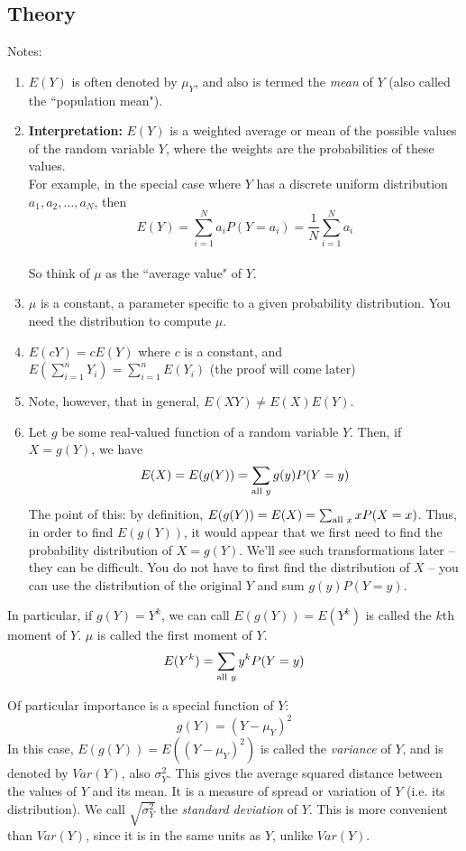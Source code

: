 \documentclass[12pt]{article}
\begin{document}
\subsection{Theory}
Notes:
\begin{enumerate}
    \item $E(Y)$ is often denoted by $\mu_Y$, and also is termed the \emph{mean} of $Y$ (also called the ``population mean").
    \item \textbf{Interpretation:} $E(Y)$ is a weighted average or mean of the possible values of the random variable $Y$, where the weights are the probabilities of these values. \\
        For example, in the special case where $Y$ has a discrete uniform distribution $a_1, a_2, \ldots, a_N$, then \\
            \[
                E(Y) = \sum_{i = 1}^{N} a_i P(Y = a_i) = \frac{1}{N} \sum_{i = 1}^{N} a_i
            \]
         \\ So think of $\mu$ as the ``average value" of $Y$.
    \item $\mu$ is a constant, a parameter specific to a given probability distribution. You need the distribution to compute $\mu$.
    \item $E(c Y) = c E(Y)$ where $c$ is a constant, and $E (\sum_{i=1}^{n} Y_i) = \sum_{i=1}^{n} E(Y_i)$ (the proof will come later)
    \item Note, however, that in general, $E(XY) \neq E(X)E(Y)$.
    \item Let $g$ be some real-valued function of a random variable $Y$. Then, if $X = g(Y)$, we have
        \[
            E(X) = E(g(Y)) = \sum_{\textnormal{all } y} g(y) P(Y=y)
        \]
        The point of this: by definition, $E(g(Y)) = E(X) = \sum_{\textnormal{all } x} x P(X = x)$. Thus, in order to find $E(g(Y))$, it would appear that we first need to find the probability distribution of $X = g(Y)$. We'll see such transformations later -- they can be difficult. You do not have to first find the distribution of $X$ -- you can use the distribution of the original $Y$ and sum $g(y)P(Y=y)$.
\end{enumerate}

In particular, if $g(Y) = Y^k$, we can call $E(g(Y)) = E(Y^k)$ is called the $k$th moment of $Y$. $\mu$ is called the first moment of $Y$.
\[
    E(Y^k) = \sum_{\textnormal{all } y} y^k P(Y=y)
\]

Of particular importance is a special function of $Y$:
\[
    g(Y) = (Y - \mu_Y)^2
\]
In this case, $E(g(Y)) = E ((Y - \mu_Y)^2)$ is called the \emph{variance} of $Y$, and is denoted by $Var(Y)$, also $\sigma_Y^2$. This gives the average squared distance between the values of $Y$ and its mean. It is a measure of spread or variation of $Y$ (i.e. its distribution). We call $\sqrt{\sigma_Y^2}$ the \emph{standard deviation} of $Y$. This is more convenient than $Var(Y)$, since it is in the same units as $Y$, unlike $Var(Y)$.
\end{document}

